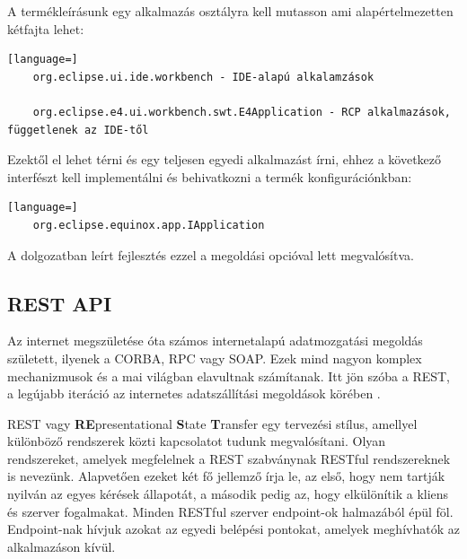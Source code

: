 A termékleírásunk egy alkalmazás osztályra kell mutasson ami alapértelmezetten kétfajta lehet:

\begin{lstlisting}[language=]
	org.eclipse.ui.ide.workbench - IDE-alapú alkalamzások
	
	org.eclipse.e4.ui.workbench.swt.E4Application - RCP alkalmazások, függetlenek az IDE-től
\end{lstlisting}

Ezektől el lehet térni és egy teljesen egyedi alkalmazást írni, ehhez a következő interfészt kell implementálni és behivatkozni a termék konfigurációnkban:

\begin{lstlisting}[language=]
	org.eclipse.equinox.app.IApplication
\end{lstlisting}

A dolgozatban leírt fejlesztés ezzel a megoldási opcióval lett megvalósítva.

\subsection{REST API}

Az internet megszületése óta számos internetalapú adatmozgatási megoldás született, ilyenek a CORBA, RPC vagy SOAP. Ezek mind nagyon komplex mechanizmusok és a mai világban elavultnak számítanak. Itt jön szóba a REST, a legújabb iteráció az internetes adatszállítási megoldások körében \cite{rest_history}.

REST vagy \textbf{RE}presentational \textbf{S}tate \textbf{T}ransfer egy tervezési stílus, amellyel különböző rendszerek közti kapcsolatot tudunk megvalósítani. Olyan rendszereket, amelyek megfelelnek a REST szabványnak RESTful rendszereknek is nevezünk. Alapvetően ezeket két fő jellemző írja le, az első, hogy nem tartják nyilván az egyes kérések állapotát, a második pedig az, hogy elkülönítik a kliens és szerver fogalmakat. Minden RESTful szerver endpoint-ok halmazából épül föl. Endpoint-nak hívjuk azokat az egyedi belépési pontokat, amelyek meghívhatók az alkalmazáson kívül.

